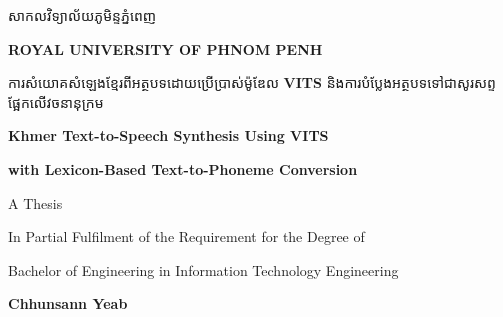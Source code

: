 \begin{titlepage}
    \centering
    \vspace*{1cm}

    \centering
    \begin{minipage}{0.9\textwidth}
        \centering
        {\khmerfont\fontsize{16pt}{20pt}\selectfont សាកលវិទ្យាល័យភូមិន្ទភ្នំពេញ\\[0.6em] \par}
        {\englishfont\fontsize{12.5pt}{20pt}\selectfont\bfseries\textbf{ROYAL UNIVERSITY OF PHNOM PENH}}
    \end{minipage}
    

    \vspace{2cm}

    \begin{minipage}{0.9\textwidth}
        \centering
        {\khmerfont\fontsize{14pt}{20pt}\selectfont ការសំយោគសំឡេងខ្មែរពីអត្ថបទដោយប្រើប្រាស់ម៉ូឌែល {\englishfont\textbf{VITS}} និងការបំប្លែងអត្ថបទទៅជាសូរសព្ទផ្អែកលើវចនានុក្រម\\[0.4em]}
        {\englishfont\fontsize{14pt}{20pt}\selectfont\bfseries Khmer Text-to-Speech Synthesis Using VITS \par}
        {\englishfont\fontsize{14pt}{20pt}\selectfont\bfseries with Lexicon-Based Text-to-Phoneme Conversion \par}
    \end{minipage}

    \vspace{3.0cm}

    {\englishfont\fontsize{14pt}{20pt}\selectfont A Thesis\par}
    \vspace{0.5cm}
    {\englishfont\fontsize{11pt}{20pt}\selectfont In Partial Fulfilment of the Requirement for the Degree of\par}
    \vspace{-0.2cm}
    {\englishfont\fontsize{11pt}{20pt}\selectfont Bachelor of Engineering in Information Technology Engineering\par}


    \vspace{3.0cm}

    {\englishfont\fontsize{14pt}{20pt}\bfseries\textbf\selectfont Chhunsann Yeab\par}

    

    

    \vspace{2.5cm}


\end{titlepage}
